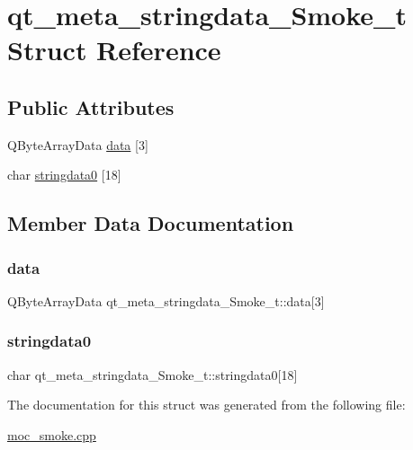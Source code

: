 \hypertarget{structqt__meta__stringdata__Smoke__t}{}\section{qt\+\_\+meta\+\_\+stringdata\+\_\+\+Smoke\+\_\+t Struct Reference}
\label{structqt__meta__stringdata__Smoke__t}
\subsection*{Public Attributes}
\begin{DoxyCompactItemize}
\item 
Q\+Byte\+Array\+Data \mbox{\hyperlink{structqt__meta__stringdata__Smoke__t_a52b1260fc32fb91b249d5ccdb8c1527c}{data}} \mbox{[}3\mbox{]}
\item 
char \mbox{\hyperlink{structqt__meta__stringdata__Smoke__t_a084e46c91242ef81eb2a8ddf528a4b84}{stringdata0}} \mbox{[}18\mbox{]}
\end{DoxyCompactItemize}


\subsection{Member Data Documentation}
\mbox{\label{structqt__meta__stringdata__Smoke__t_a52b1260fc32fb91b249d5ccdb8c1527c}} 
\subsubsection{\texorpdfstring{data}{data}}
{\footnotesize\ttfamily Q\+Byte\+Array\+Data qt\+\_\+meta\+\_\+stringdata\+\_\+\+Smoke\+\_\+t\+::data\mbox{[}3\mbox{]}}

\mbox{\label{structqt__meta__stringdata__Smoke__t_a084e46c91242ef81eb2a8ddf528a4b84}} 
\subsubsection{\texorpdfstring{stringdata0}{stringdata0}}
{\footnotesize\ttfamily char qt\+\_\+meta\+\_\+stringdata\+\_\+\+Smoke\+\_\+t\+::stringdata0\mbox{[}18\mbox{]}}



The documentation for this struct was generated from the following file\+:\begin{DoxyCompactItemize}
\item 
\mbox{\hyperlink{moc__smoke_8cpp}{moc\+\_\+smoke.\+cpp}}\end{DoxyCompactItemize}

